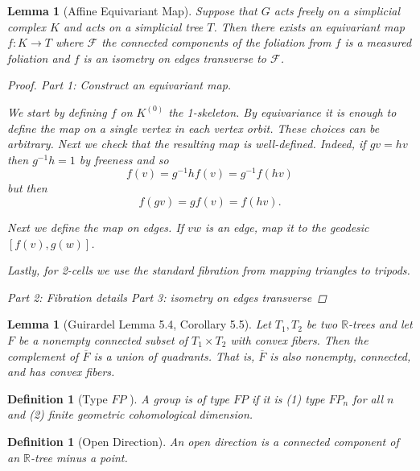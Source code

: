 \documentclass{article}
\theoremstyle{mystyle}
\newtheorem{lem}[thm]{Lemma}
\newtheorem{defn}[thm]{Definition}
\theoremstyle{remark}
\begin{document}
\begin{lem}
    [Affine Equivariant Map]
    \label{lem:affineequivariantmap} 
    Suppose that \(G\) acts freely on a simplicial complex \(K\) and acts on a simplicial tree \(T\). Then there exists an equivariant map \(f: K \to T\) where \(\mathscr{F}\) the connected components of the foliation from \(f\) is a measured foliation and \(f\) is an isometry on edges transverse to \(\mathscr{F}\).
    \begin{proof}
        Part 1: Construct an equivariant map.

        We start by defining \(f\) on \(K^{(0)}\) the 1-skeleton. By equivariance it is enough to define the map on a single vertex in each vertex orbit. These choices can be arbitrary. Next we check that the resulting map is well-defined. Indeed, if \(gv=hv\) then \(g^{-1} h = 1\) by freeness and so \[ f(v)=g^{-1}h f(v)=g^{-1} f(hv) \] but then \[ f(gv)=gf(v)=f(hv).\] 
        
        Next we define the map on edges. If \(vw\) is an edge, map it to the geodesic \([f(v),g(w)]\). 
        
        Lastly, for 2-cells we use the standard fibration from mapping triangles to tripods.
        
        Part 2: Fibration details
        Part 3: isometry on edges transverse
    \end{proof}
\end{lem}
\begin{lem}
	[Guirardel Lemma 5.4, Corollary 5.5]
 \label{lem:guirardel} 
	Let \(T_{1} , T_{2}\) be two \(\mathbb{R}\)-trees and let \(F\) be a nonempty connected subset of \(T_{1} \times T_{2}\) with convex fibers. Then the complement of \(\overline{F}\) is a union of quadrants. That is, \(\overline{F}\) is also nonempty, connected, and has convex fibers.
\end{lem}

\begin{defn}
	[Type \(FP\) ]
	A group is of type \(FP\) if it is (1) type \(FP_n\) for all \(n\) and (2) finite geometric cohomological dimension.
\end{defn}


\begin{defn}[Open Direction] An open direction is a connected component of an \(\mathbb{R}\)-tree minus a point. 
\end{defn}
\end{document}
